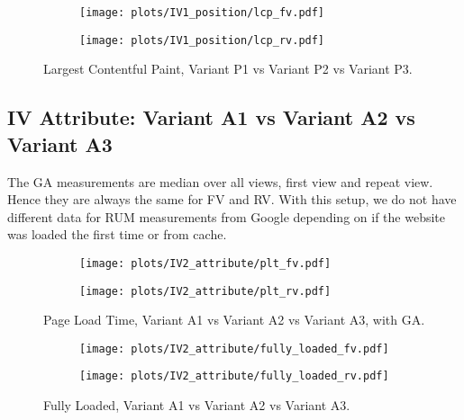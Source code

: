 \begin{figure}
	\centering
	\begin{subfigure}{.5\textwidth}
		\centering
		\texttt{[image: plots/IV1\_position/lcp\_fv.pdf]}
		\label{fig:sub1}
	\end{subfigure}%
	\begin{subfigure}{.5\textwidth}
		\centering
		\texttt{[image: plots/IV1\_position/lcp\_rv.pdf]}
		\label{fig:sub2}
	\end{subfigure}
	\caption{Largest Contentful Paint, Variant P1 vs Variant P2 vs Variant P3.}
	\label{figure:plt_original_test}
\end{figure}








\subsection{IV Attribute: Variant A1 vs Variant A2 vs Variant A3}


The GA measurements are median over all views, first view and repeat view.
Hence they are always the same for FV and RV.
With this setup, we do not have different data for RUM measurements from Google depending on if the website was loaded the first time or from cache.




\begin{figure}
	\centering
	\begin{subfigure}{.5\textwidth}
		\centering
		\texttt{[image: plots/IV2\_attribute/plt\_fv.pdf]}
		\label{fig:sub1}
	\end{subfigure}%
	\begin{subfigure}{.5\textwidth}
		\centering
		\texttt{[image: plots/IV2\_attribute/plt\_rv.pdf]}
		\label{fig:sub2}
	\end{subfigure}
	\caption{Page Load Time, Variant A1 vs Variant A2 vs Variant A3, with GA.}
	\label{figure:plt_original_test}
\end{figure}


\begin{figure}
	\centering
	\begin{subfigure}{.5\textwidth}
		\centering
		\texttt{[image: plots/IV2\_attribute/fully\_loaded\_fv.pdf]}
		\label{fig:sub1}
	\end{subfigure}%
	\begin{subfigure}{.5\textwidth}
		\centering
		\texttt{[image: plots/IV2\_attribute/fully\_loaded\_rv.pdf]}
		\label{fig:sub2}
	\end{subfigure}
	\caption{Fully Loaded, Variant A1 vs Variant A2 vs Variant A3.}
	\label{figure:plt_original_test}
\end{figure}

